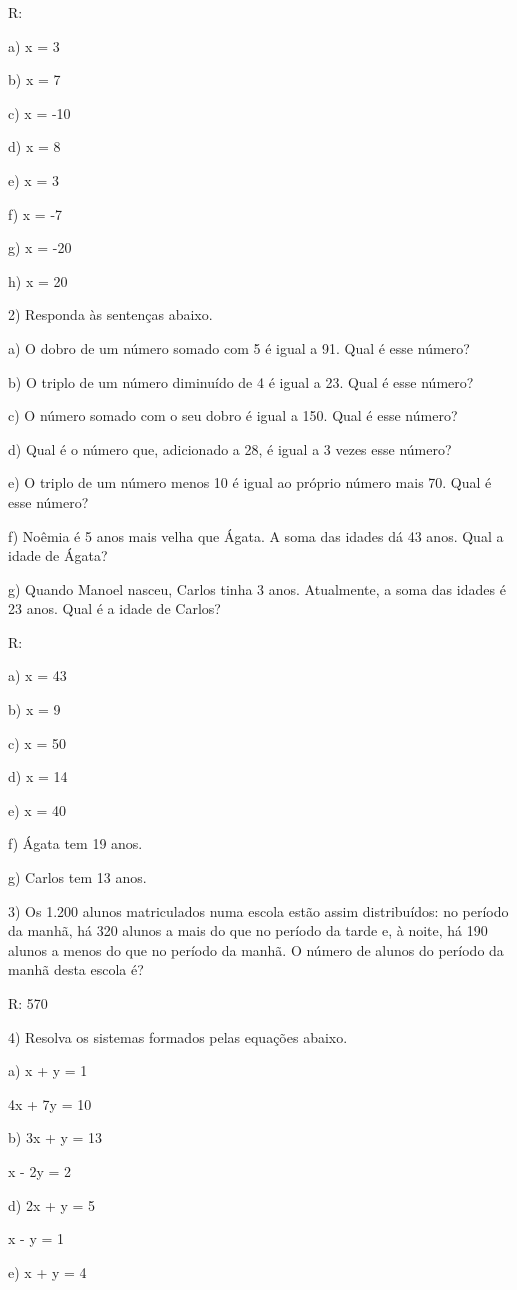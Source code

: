 R:

a) x = 3

b) x = 7

c) x = -10

d) x = 8

e) x = 3

f) x = -7

g) x = -20

h) x = 20

2) Responda às sentenças abaixo.

a) O dobro de um número somado com 5 é igual a 91. Qual é esse número?

b) O triplo de um número diminuído de 4 é igual a 23. Qual é esse
número?

c) O número somado com o seu dobro é igual a 150. Qual é esse número?

d) Qual é o número que, adicionado a 28, é igual a 3 vezes esse número?

e) O triplo de um número menos 10 é igual ao próprio número mais 70.
Qual é esse número?

f) Noêmia é 5 anos mais velha que Ágata. A soma das idades dá 43 anos.
Qual a idade de Ágata?

g) Quando Manoel nasceu, Carlos tinha 3 anos. Atualmente, a soma das
idades é 23 anos. Qual é a idade de Carlos?

R:

a) x = 43

b) x = 9

c) x = 50

d) x = 14

e) x = 40

f) Ágata tem 19 anos.

g) Carlos tem 13 anos.

3) Os 1.200 alunos matriculados numa escola estão assim distribuídos: no
período da manhã, há 320 alunos a mais do que no período da tarde e, à
noite, há 190 alunos a menos do que no período da manhã. O número de
alunos do período da manhã desta escola é?

R: 570

4) Resolva os sistemas formados pelas equações abaixo.

a) x + y = 1

4x + 7y = 10

b) 3x + y = 13

x - 2y = 2

d) 2x + y = 5

x - y = 1

e) x + y = 4

